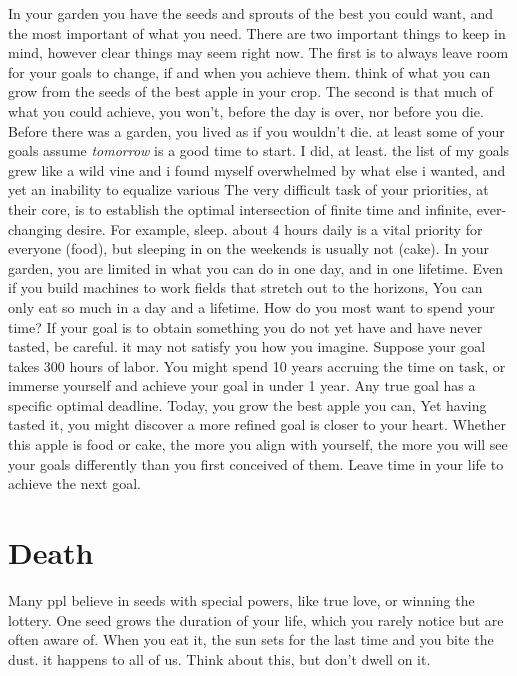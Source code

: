 \documentclass[
]{book}
\begin{document}
In your garden you have the seeds and sprouts of the best you could want, and the most important of what you need.
There are two important things to keep in mind, however clear things may seem right now.
The first is to always leave room for your goals to change, if and when you achieve them. think of what you can grow from the seeds of the best apple in your crop.
The second is that much of what you could achieve, you won't, before the day is over, nor before you die.
Before there was a garden, you lived as if you wouldn't die. at least some of your goals assume \emph{tomorrow} is a good time to start.
I did, at least. the list of my goals grew like a wild vine and i found myself overwhelmed by what else i wanted, and yet an inability to equalize various
The very difficult task of your priorities, at their core, is to establish the optimal intersection of finite time and infinite, ever-changing desire.
For example, sleep. about 4 hours daily is a vital priority for everyone (food), but sleeping in on the weekends is usually not (cake).
In your garden, you are limited in what you can do in one day, and in one lifetime.
Even if you build machines to work fields that stretch out to the horizons,
You can only eat so much in a day and a lifetime.
How do you most want to spend your time?
If your goal is to obtain something you do not yet have and have never tasted, be careful. it may not satisfy you how you imagine.
Suppose your goal takes 300 hours of labor.
You might spend 10 years accruing the time on task, or immerse yourself and achieve your goal in under 1 year.
Any true goal has a specific optimal deadline.
Today, you grow the best apple you can,
Yet having tasted it, you might discover a more refined goal is closer to your heart.
Whether this apple is food or cake, the more you align with yourself, the more you will see your goals differently than you first conceived of them.
Leave time in your life to achieve the next goal.

\hypertarget{death}{%
\section{Death}\label{death}}

Many ppl believe in seeds with special powers, like true love, or winning the lottery.
One seed grows the duration of your life, which you rarely notice but are often aware of.
When you eat it, the sun sets for the last time and you bite the dust. it happens to all of us.
Think about this, but don't dwell on it.
\end{document}
